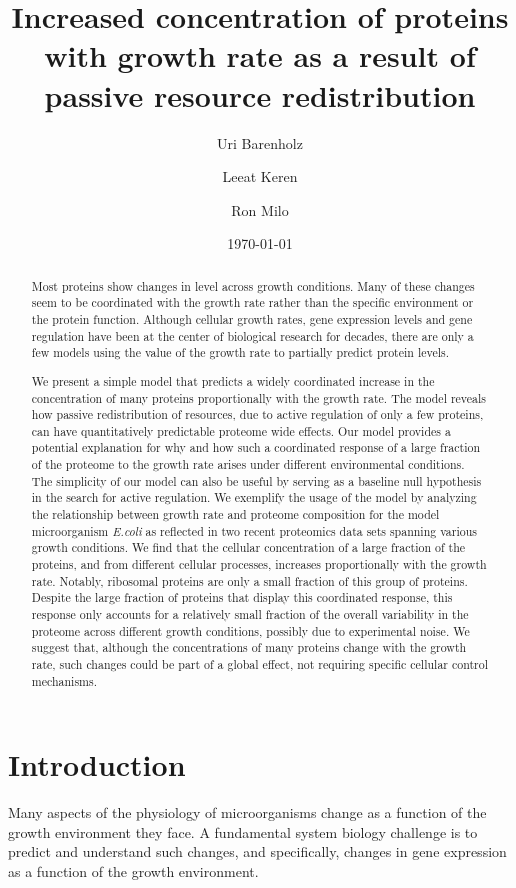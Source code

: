 \documentclass[a4paper]{article}
\title{Increased concentration of proteins with growth rate as a result of passive resource redistribution}
\author{Uri Barenholz}
\author{Leeat Keren}
\author{Ron Milo}
\affil{Weizmann Institute of Science}
\date{\today}
\begin{document}
\maketitle 

\begin{abstract}
Most proteins show changes in level across growth conditions. Many of
these changes seem to be coordinated with the growth rate rather than
the specific environment or the protein function. Although cellular
growth rates, gene expression levels and gene regulation have been at
the center of biological research for decades, there are only a few
models using the value of the growth rate to partially predict protein
levels.

We present a simple model that predicts a widely coordinated increase in
the concentration of many proteins proportionally with the growth rate.
The model reveals how passive redistribution of resources, due to active
regulation of only a few proteins, can have quantitatively predictable
proteome wide effects. Our model provides a potential explanation for
why and how such a coordinated response of a large fraction of the
proteome to the growth rate arises under different environmental
conditions. The simplicity of our model can also be useful by serving as
a baseline null hypothesis in the search for active regulation. We
exemplify the usage of the model by analyzing the relationship between
growth rate and proteome composition for the model microorganism
\emph{E.coli} as reflected in two recent proteomics data sets spanning
various growth conditions. We find that the cellular concentration of a
large fraction of the proteins, and from different cellular processes,
increases proportionally with the growth rate. Notably, ribosomal
proteins are only a small fraction of this group of proteins. Despite
the large fraction of proteins that display this coordinated response,
this response only accounts for a relatively small fraction of the
overall variability in the proteome across different growth conditions,
possibly due to experimental noise. We suggest that, although the
concentrations of many proteins change with the growth rate, such
changes could be part of a global effect, not requiring specific
cellular control mechanisms.

\end{abstract}

\section{Introduction}
Many aspects of the physiology of microorganisms change as a function of the growth environment they face.
A fundamental system biology challenge is to predict and understand such changes, and specifically, changes in gene expression as a function of the growth environment.
\end{document}
